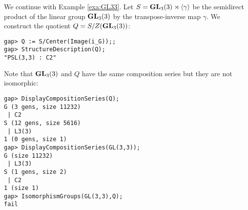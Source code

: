 \begin{example}
\label{exa:quotientGL33}
    We continue with Example \ref{exa:GL33}. 
    Let $S=\mathbf{GL}_3(3)\rtimes\langle \gamma\rangle$ be
    the semidirect product of the linear group $\mathbf{GL}_3(3)$ 
    by the transpose-inverse map $\gamma$. 
    We construct the quotient $Q=S/Z(\mathbf{GL}_3(3))$:  
\begin{lstlisting}
gap> Q := S/Center(Image(i_G));;
gap> StructureDescription(Q);
"PSL(3,3) : C2"
\end{lstlisting}
Note that $\mathbf{GL}_3(3)$ and $Q$ have the same composition series but they are 
not isomorphic: 
\begin{lstlisting}
gap> DisplayCompositionSeries(Q);
G (3 gens, size 11232)
 | C2
S (12 gens, size 5616)
 | L3(3)
1 (0 gens, size 1)
gap> DisplayCompositionSeries(GL(3,3));
G (size 11232)
 | L3(3)
S (1 gens, size 2)
 | C2
1 (size 1)
gap> IsomorphismGroups(GL(3,3),Q);
fail
\end{lstlisting}
\end{example}

